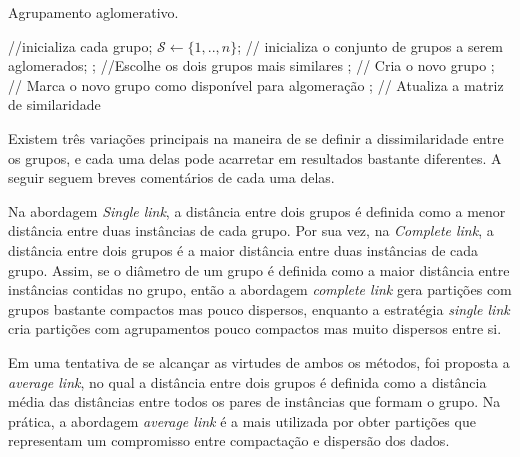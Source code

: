 \begin{algorithm}
	\caption{Agrupamento aglomerativo.}
	\label{alg:aglomerative_clustering}
	\begin{algorithmic}[1]
		
			 //inicializa cada grupo;
		\ENDFOR
		\STATE $\mathcal{S} \leftarrow \{1,..,n\}$; // inicializa o conjunto de grupos a serem aglomerados;
			; //Escolhe os dois grupos mais similares
			; // Cria o novo grupo
				; // Marca o novo grupo como disponível para algomeração
			\ENDIF
			\renewcommand{\algorithmicforall}{\textbf{foreach}}
				 ; // Atualiza a matriz de similaridade
			\ENDFOR			
		\ENDWHILE
		
	\end{algorithmic}
\end{algorithm}

Existem três variações principais na maneira de se definir a dissimilaridade entre os grupos, e cada uma delas pode acarretar em resultados bastante diferentes. A seguir seguem breves comentários de cada uma delas. 

Na abordagem \emph{Single link}, a distância entre dois grupos é definida como a menor distância entre duas instâncias de cada grupo. Por sua vez, na \emph{Complete link}, a distância entre dois grupos é a maior distância entre duas instâncias de cada grupo. Assim, se o diâmetro de um grupo é definida como a maior distância entre instâncias contidas no grupo, então a abordagem \emph{complete link} gera partições com grupos bastante compactos mas pouco dispersos, enquanto a estratégia \emph{single link} cria partições com agrupamentos pouco compactos mas muito dispersos entre si.

 Em uma tentativa de se alcançar as virtudes de ambos os métodos, foi proposta a \emph{average link}, no qual a distância entre dois grupos é definida como a distância média das distâncias entre todos os pares de instâncias que formam o grupo. Na prática, a abordagem \emph{average link} é a mais utilizada por obter partições que representam um compromisso entre compactação e dispersão dos dados.


